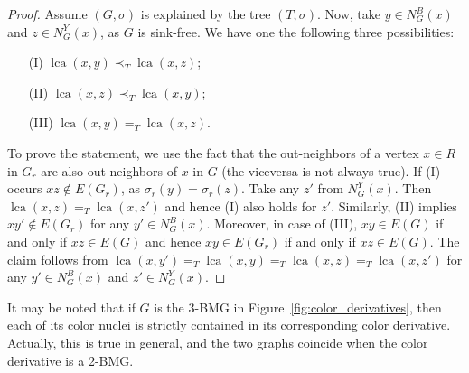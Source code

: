 \documentclass[final,3p,times]{elsarticle}
\DeclareMathOperator{\lca}{lca}
\begin{document}
\begin{proof} 
Assume $(G,\sigma)$ is explained by the tree $(T,\sigma)$. Now, take $y\in N_{G}^{B}(x)$ and $z\in N_{G}^{Y}(x)$, as $G$ is sink-free.  We have one the following three possibilities:
\begin{itemize}
\item[(I)] $\lca(x,y)\prec_T \lca(x,z)$;
\item[(II)] $\lca(x,z)\prec_T \lca(x,y)$;
\item[(III)] $\lca(x,y)=_T \lca(x,z)$.
\end{itemize}
To prove the statement, we use the fact that the out-neighbors of a vertex $x \in R$ in $G_r$ are also out-neighbors of $x$ in $G$ (the viceversa is not always true).
If (I) occurs $xz\not\in E(G_r)$, as $\sigma_r(y)=\sigma_r(z)$. Take any $z'$ from $N_{G}^{Y}(x)$. Then $\lca(x,z)=_T \lca(x,z')$ and hence (I) also holds for $z'$. Similarly, (II) implies $xy'\not\in E(G_r)$ for any $y'\in N_{G}^{B}(x)$. Moreover, in case of (III),  $xy\in E(G)$ if and only if $xz\in E(G)$ and hence $xy\in E(G_r)$ if and only if $xz\in E(G)$. The claim follows from  $\lca(x,y')=_T \lca(x,y)=_T\lca(x,z)=_T \lca(x,z')$ for any $y'\in N_{G}^{B}(x)$ and $z'\in N_{G}^{Y}(x)$.
\end{proof}

It may be noted that if $G$ is the 3-BMG in Figure~\ref{fig:color_derivatives}, then each of its color nuclei is strictly contained in its corresponding color derivative. Actually, this is true in general, and the two graphs coincide when the color derivative is a 2-BMG.
\end{document}
